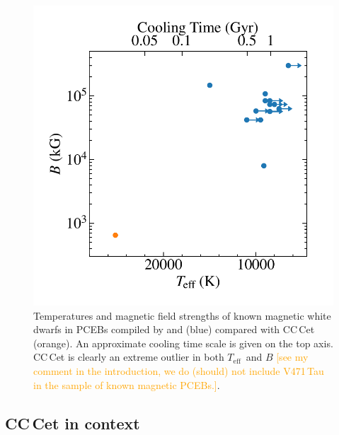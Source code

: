 \documentclass[fleqn,usenatbib]{mnras}
\newcommand{\Teff}{\mbox{$T_{\mathrm{eff}}$}}
\newcommand{\bgc}[1]{\textcolor{orange}{[#1]}}
\begin{document}
\begin{figure}
    \centering
    \includegraphics[width=8 cm]{teffvB.pdf}
    \caption{Temperatures and magnetic field strengths of known magnetic white dwarfs in PCEBs compiled by \citet{ferrarioetal15-1} and \citet{parsonsetal21-1} (blue) compared with CC\,Cet (orange). An approximate cooling time scale is given on the top axis. CC\,Cet is clearly an extreme outlier in both \Teff\ and $B$ \bgc{see my comment in the introduction, we do (should) not include V471\,Tau in the sample of known magnetic PCEBs.}.}
    \label{fig:teffB}
\end{figure}

\subsection{CC\,Cet in context}




\end{document}
